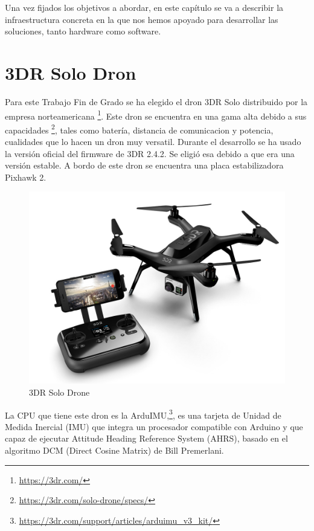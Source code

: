 Una vez fijados los objetivos a abordar, en este capítulo se va a
describir la infraestructura concreta en la que nos hemos apoyado
para desarrollar las soluciones, tanto hardware como software.

\section{3DR Solo Dron}
Para este Trabajo Fin de Grado se ha elegido el dron 3DR\cite{3dr} Solo distribuido por la empresa norteamericana \footnote{\url{https://3dr.com/}}. Este dron se encuentra en una gama alta debido a sus capacidades \footnote{\url{https://3dr.com/solo-drone/specs/}}, tales como batería, distancia de comunicacion y potencia, cualidades que lo hacen un dron muy versatil. Durante el desarrollo se ha usado la versión oficial del firmware de 3DR 2.4.2. Se eligió esa debido a que era una versión estable. A bordo de este dron se encuentra una placa estabilizadora Pixhawk 2.

\begin{figure}[H]
  \centering
  \includegraphics[scale=1]{imagenes/3drSoloDron.jpg}
  \caption{3DR Solo Drone}
  \label{fig:3drsolodrone}
\end{figure}

La CPU que tiene este dron es la ArduIMU,\footnote{\url{https://3dr.com/support/articles/arduimu_v3_kit/}}, es una tarjeta de Unidad de Medida Inercial (IMU) que integra un procesador compatible con Arduino y que capaz de ejecutar Attitude Heading Reference System (AHRS), basado en el algoritmo DCM (Direct Cosine Matrix) de Bill Premerlani.

